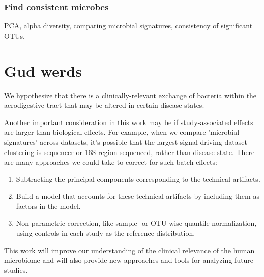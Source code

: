 \documentclass[12pt]{article}
\begin{document}
\subsubsection{Find consistent microbes}
PCA, alpha diversity, comparing microbial signatures, consistency of significant OTUs.

\section{Gud werds}
We hypothesize that there is a clinically-relevant exchange of bacteria within the aerodigestive tract that may be altered in certain disease states. 


Another important consideration in this work may be if study-associated effects are larger than biological effects. For example, when we compare 'microbial signatures' across datasets, it's possible that the largest signal driving dataset clustering is sequencer or 16S region sequenced, rather than disease state. There are many approaches we could take to correct for such batch effects:
\begin{enumerate}
	\item Subtracting the principal components corresponding to the technical artifacts.
	\item Build a model that accounts for these technical artifacts by including them as factors in the model.
	\item Non-parametric correction, like sample- or OTU-wise quantile normalization, using controls in each study as the reference distribution.
\end{enumerate}

This work will improve our 
understanding of the clinical relevance of the human microbiome and 
will also provide new approaches and tools for analyzing future 
studies.



\end{document}
